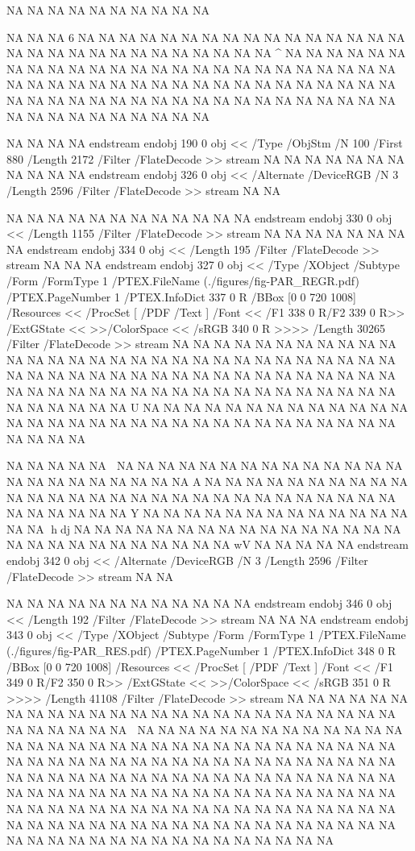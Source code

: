 {NA
NA
NA
NA
NA
NA
NA
NA
NA
NA

NA
NA
NA
6
NA
NA
NA
NA
NA
NA
NA
NA
NA
NA
NA
NA
NA
NA
NA
NA
NA
NA
NA
NA
NA
NA
NA
NA
NA
NA
NA
NA
NA
^	
NA
NA
NA
NA
NA
NA
NA
NA
NA
NA
NA
NA
NA
NA
NA
NA
NA
NA
NA
NA
NA
NA
NA
NA
NA
NA
NA
NA
NA
NA
NA
NA
NA
NA
NA
NA
NA
NA
NA
NA
NA
NA
NA
NA
NA
NA
NA
NA
NA
NA
NA
NA
NA
NA
NA
NA
NA
NA
NA
NA
NA
NA
NA
NA
NA
NA
NA
NA
NA
NA
NA
NA
NA

NA
NA
NA
NA
endstream
endobj
190 0 obj <<
/Type /ObjStm
/N 100
/First 880
/Length 2172      
/Filter /FlateDecode
>>
stream
NA
NA
NA
NA
NA
NA
NA
NA
NA
NA
NA
endstream
endobj
326 0 obj
<<
/Alternate /DeviceRGB
/N 3
/Length 2596
/Filter /FlateDecode
>>
stream
NA
NA

NA
NA
NA
NA
NA
NA
NA
NA
NA
NA
NA
NA
endstream
endobj
330 0 obj <<
/Length 1155      
/Filter /FlateDecode
>>
stream
NA
NA
NA
NA
NA
NA
NA
NA
endstream
endobj
334 0 obj <<
/Length 195       
/Filter /FlateDecode
>>
stream
NA
NA
NA
endstream
endobj
327 0 obj <<
/Type /XObject
/Subtype /Form
/FormType 1
/PTEX.FileName (./figures/fig-PAR_REGR.pdf)
/PTEX.PageNumber 1
/PTEX.InfoDict 337 0 R
/BBox [0 0 720 1008]
/Resources <<
/ProcSet [ /PDF /Text ]
/Font << /F1 338 0 R/F2 339 0 R>>
/ExtGState <<
>>/ColorSpace <<
/sRGB 340 0 R
>>>>
/Length 30265
/Filter /FlateDecode
>>
stream
NA
NA
NA
NA
NA
NA
NA
NA
NA
NA
NA
NA
NA
NA
NA
NA
NA
NA
NA
NA
NA
NA
NA
NA
NA
NA
NA
NA
NA
NA
NA
NA
NA
NA
NA
NA
NA
NA
NA
NA
NA
NA
NA
NA
NA
NA
NA
NA
NA
NA
NA
NA
NA
NA
NA
NA
NA
NA
NA
NA
NA
NA
NA
NA
NA
NA
NA
NA
NA
NA
NA
NA
NA
NA
U
NA
NA
NA
NA
NA
NA
NA
NA
NA
NA
NA
NA
NA
NA
NA
NA
NA
NA
NA
NA
NA
NA
NA
NA
NA
NA
NA
NA
NA
NA
NA
NA
NA
NA
NA
NA

NA
NA
NA
NA
NA

NA
NA
NA
NA
NA
NA
NA
NA
NA
NA
NA
NA
NA
NA
NA
NA
NA
NA
NA
NA
NA
NA
NA
A
NA
NA
NA
NA
NA
NA
NA
NA
NA
NA
NA
NA
NA
NA
NA
NA
NA
NA
NA
NA
NA
NA
NA
NA
NA
NA
NA
NA
NA
NA
NA
NA
NA
NA
NA
Y
NA
NA
NA
NA
NA
NA
NA
NA
NA
NA
NA
NA
NA
NA
NA
hdj
NA
NA
NA
NA
NA
NA
NA
NA
NA
NA
NA
NA
NA
NA
NA
NA
NA
NA
NA
NA
NA
NA
NA
NA
NA
NA
NA
wV
NA
NA
NA
NA
NA
endstream
endobj
342 0 obj
<<
/Alternate /DeviceRGB
/N 3
/Length 2596
/Filter /FlateDecode
>>
stream
NA
NA

NA
NA
NA
NA
NA
NA
NA
NA
NA
NA
NA
NA
endstream
endobj
346 0 obj <<
/Length 192       
/Filter /FlateDecode
>>
stream
NA
NA
NA
endstream
endobj
343 0 obj <<
/Type /XObject
/Subtype /Form
/FormType 1
/PTEX.FileName (./figures/fig-PAR_RES.pdf)
/PTEX.PageNumber 1
/PTEX.InfoDict 348 0 R
/BBox [0 0 720 1008]
/Resources <<
/ProcSet [ /PDF /Text ]
/Font << /F1 349 0 R/F2 350 0 R>>
/ExtGState <<
>>/ColorSpace <<
/sRGB 351 0 R
>>>>
/Length 41108
/Filter /FlateDecode
>>
stream
NA
NA
NA
NA
NA
NA
NA
NA
NA
NA
NA
NA
NA
NA
NA
NA
NA
NA
NA
NA
NA
NA
NA
NA
NA
NA
NA
NA
NA
NA
NA

NA
NA
NA
NA
NA
NA
NA
NA
NA
NA
NA
NA
NA
NA
NA
NA
NA
NA
NA
NA
NA
NA
NA
NA
NA
NA
NA
NA
NA
NA
NA
NA
NA
NA
NA
NA
NA
NA
NA
NA
NA
NA
NA
NA
NA
NA
NA
NA
NA
NA
NA
NA
NA
NA
NA
NA
NA
NA
NA
NA
NA
NA
NA
NA
NA
NA
NA
NA
NA
NA
NA
NA
NA
NA
NA
NA
NA
NA
NA
NA
NA
NA
NA
NA
NA
NA
NA
NA
NA
NA
NA
NA
NA
NA
NA
NA
NA
NA
NA
NA
NA
NA
NA
NA
NA
NA
NA
NA
NA
NA
NA
NA
NA
NA
NA
NA
NA
NA
NA
NA
NA
NA
NA
NA
NA
NA
NA
NA
NA
NA
NA
NA
NA
NA
NA
NA
NA
NA
NA
NA
NA
NA
NA

}
